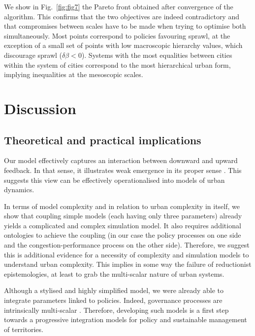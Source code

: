 \documentclass[11pt]{article}
\begin{document}
We show in Fig.~\ref{fig:fig7} the Pareto front obtained after convergence of the algorithm. This confirms that the two objectives are indeed contradictory and that compromises between scales have to be made when trying to optimise both simultaneously. Most points correspond to policies favouring sprawl, at the exception of a small set of points with low macroscopic hierarchy values, which discourage sprawl ($\delta \beta < 0$). Systems with the most equalities between cities within the system of cities correspond to the most hierarchical urban form, implying inequalities at the mesoscopic scales.



\section{Discussion}



\subsection{Theoretical and practical implications}

Our model effectively captures an interaction between downward and upward feedback. In that sense, it illustrates weak emergence in its proper sense \cite{bedau2002downward}. This suggests this view can be effectively operationalised into models of urban dynamics.

In terms of model complexity and in relation to urban complexity in itself, we show that coupling simple models (each having only three parameters) already yields a complicated and complex simulation model. It also requires additional ontologies to achieve the coupling (in our case the policy processes on one side and the congestion-performance process on the other side). Therefore, we suggest this is additional evidence for a necessity of complexity and simulation models to understand urban complexity. This implies in some way the failure of reductionist epistemologies, at least to grab the multi-scalar nature of urban systems.

Although a stylised and highly simplified model, we were already able to integrate parameters linked to policies. Indeed, governance processes are intrinsically multi-scalar \cite{liao2017ouverture}. Therefore, developing such models is a first step towards a progressive integration models for policy and sustainable management of territories.
\end{document}
